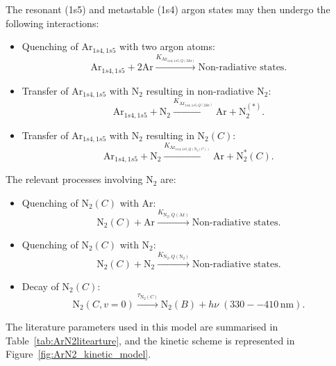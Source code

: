\documentclass[12pt,a4paper]{article}
\newcommand{\N}{\mathrm{N}}
\newcommand{\Ar}{\mathrm{Ar}}
\begin{document}
The resonant (1s5) and metastable (1s4) argon states may then undergo the following interactions:

\begin{itemize}
    \item Quenching of $\Ar_{1s4,1s5}$ with two argon atoms:
    \begin{equation}
        \Ar_{1s4,1s5} + 2 \Ar
        \xrightarrow{K_{\Ar_{1s4,1s5,Q(2\Ar)}}}  \text{Non-radiative states}.
    \end{equation}

    \item Transfer of $\Ar_{1s4,1s5}$ with $\N_2$ resulting in non-radiative $\N_2$:
    \begin{equation}
        \Ar_{1s4,1s5} + \N_2
        \xrightarrow{K_{\Ar_{1s4,1s5,Q(2\Ar)}}}  \Ar + \N_2^{(*)}.
    \end{equation}

    \item Transfer of $\Ar_{1s4,1s5}$ with $\N_2$ resulting in $\N_2(C)$:
    \begin{equation}
        \Ar_{1s4,1s5} + \N_2
        \xrightarrow{K_{\Ar_{1s4,1s5,Q(\N_2(C))}}}  \Ar + \N_2^*(C).
    \end{equation}
\end{itemize}

The relevant processes involving $\N_2$ are:

\begin{itemize}
    \item Quenching of $\N_2(C)$ with $\Ar$:
    \begin{equation}
        \N_2(C) +  \Ar
        \xrightarrow{K_{\N_2,Q(\Ar)}}  \text{Non-radiative states}.
    \end{equation}

    \item Quenching of $\N_2(C)$ with $\N_2$:
    \begin{equation}
        \N_2(C) +  \N_2
        \xrightarrow{K_{\N_2,Q(\N_2)}}  \text{Non-radiative states}.
    \end{equation}

    \item Decay of $\N_2(C)$:
    \begin{equation}
        \N_2(C,v=0) \xrightarrow{\tau_{\N_2(C)}}  \N_2(B) + h\nu \;(330--410\,\mathrm{nm}).
    \end{equation}
\end{itemize}

The literature parameters used in this model are summarised in Table~\ref{tab:ArN2litearture}, and the kinetic scheme is represented in Figure~\ref{fig:ArN2_kinetic_model}.
\end{document}

